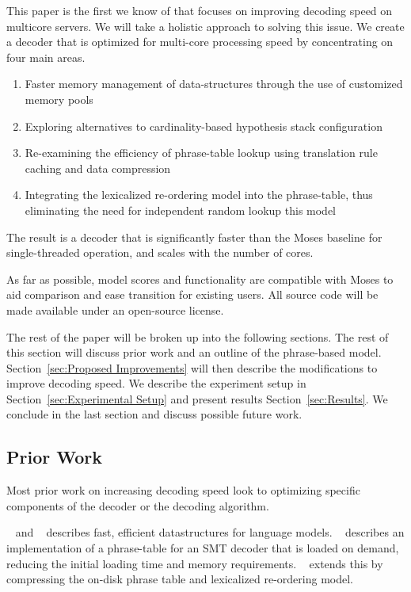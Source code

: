 \documentclass[11pt]{article}
\begin{document}
This paper is the first we know of that focuses on improving decoding speed on multicore servers. We will take a holistic approach to solving this issue. We create a decoder that is optimized for multi-core processing speed by concentrating on four main areas.
\begin{enumerate}
  \item \vspace{-2 mm} Faster memory management of data-structures through the use of customized memory pools
  \item \vspace{-2 mm} Exploring alternatives to cardinality-based hypothesis stack configuration
  \item \vspace{-2 mm} Re-examining the efficiency of phrase-table lookup using translation rule caching and data compression
  \item \vspace{-2 mm} Integrating the lexicalized re-ordering model into the phrase-table, thus eliminating the need for independent random lookup this model 
\end{enumerate}
The result is a decoder that is significantly faster than the Moses baseline for single-threaded operation, and scales with the number of cores.

As far as possible, model scores and functionality are compatible with Moses to aid comparison and ease transition for existing users. All source code will be made available under an open-source license.

The rest of the paper will be broken up into the following sections. The rest of this section will discuss prior work and an outline of the phrase-based model. Section~\ref{sec:Proposed Improvements} will then describe the modifications to improve decoding speed. We describe the experiment setup in Section~\ref{sec:Experimental Setup} and present results Section~\ref{sec:Results}. We conclude in the last section and discuss possible future work.

\subsection{Prior Work}

Most prior work on increasing decoding speed look to optimizing specific components of the decoder or the decoding algorithm. 

~ and ~ describes fast, efficient datastructures for language models. ~ describes an implementation of a phrase-table for an SMT decoder that is loaded on demand, reducing the initial loading time and memory requirements. ~ extends this by compressing the on-disk phrase table and lexicalized re-ordering model. 
\end{document}
